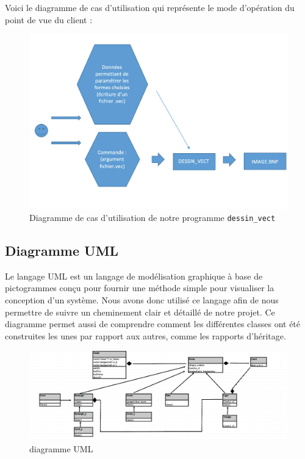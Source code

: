 \documentclass[11pt]{article}
\begin{document}
Voici le diagramme de cas d'utilisation qui représente le mode d'opération du point de vue du client : 

\begin{figure}[!htbp]
    \begin{center}
        \includegraphics[width=16cm]{Photo1.png}
        \caption[Diagramme des cas d'utilisation]{Diagramme de cas d'utilisation de notre programme \texttt{dessin\_vect}}
    \centering
    \end{center}
\end{figure}

\clearpage

\subsection{Diagramme UML}

Le langage UML est un langage de modélisation graphique à base de pictogrammes conçu pour fournir une méthode simple pour visualiser la conception d'un système. Nous avons donc utilisé ce langage afin de nous permettre de suivre un cheminement clair et détaillé de notre projet. Ce diagramme permet aussi de comprendre comment les différentes classes ont été construites les unes par rapport aux autres, comme les rapports d'héritage. \\

\begin{figure}[!htbp]
    \begin{center}
        \includegraphics[width=20cm]{UML1.jpg}
        \caption{diagramme UML}
    \centering
    \end{center}
\end{figure}
\end{document}
